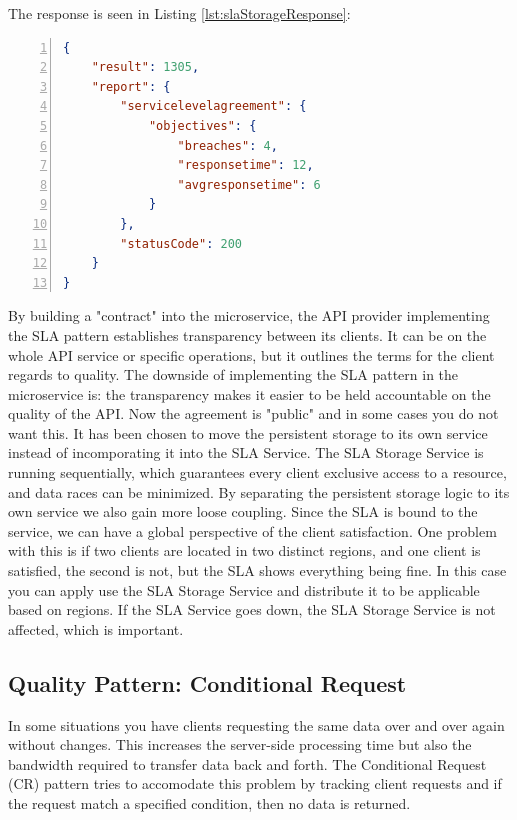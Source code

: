 \documentclass[12pt]{article}
\begin{document}
The response is seen in Listing \ref{lst:slaStorageResponse}:

\begin{lstlisting}[caption=The response to the client when a calculation is requested, 
captionpos=b, language=json, label={lst:slaStorageResponse}, numbers=left]
{
    "result": 1305,
    "report": {
        "servicelevelagreement": {
            "objectives": {
                "breaches": 4,
                "responsetime": 12,
                "avgresponsetime": 6
            }
        },
        "statusCode": 200
    }
}
\end{lstlisting}

By building a "contract" into the microservice, the API provider implementing the SLA pattern establishes transparency between its clients. It can be on the whole API service or specific operations, but it outlines the terms for the client regards to quality. The downside of implementing the SLA pattern in the microservice is: the transparency makes it easier to be held accountable on the quality of the API. Now the agreement is "public" and in some cases you do not want this. It has been chosen to move the persistent storage to its own service instead of incomporating it into the SLA Service. The SLA Storage Service is running sequentially, which guarantees every client exclusive access to a resource, and data races can be minimized. By separating the persistent storage logic to its own service we also gain more loose coupling. Since the SLA is bound to the service, we can have a global perspective of the client satisfaction. One problem with this is if two clients are located in two distinct regions, and one client is satisfied, the second is not, but the SLA shows everything being fine. In this case you can apply use the SLA Storage Service and distribute it to be applicable based on regions. If the SLA Service goes down, the SLA Storage Service is not affected, which is important. 

\subsection{Quality Pattern: Conditional Request}
In some situations you have clients requesting the same data over and over again without changes. This increases the server-side processing time but also the bandwidth required to transfer data back and forth. The Conditional Request (CR) pattern tries to accomodate this problem by tracking client requests and if the request match a specified condition, then no data is returned. \\
\end{document}
